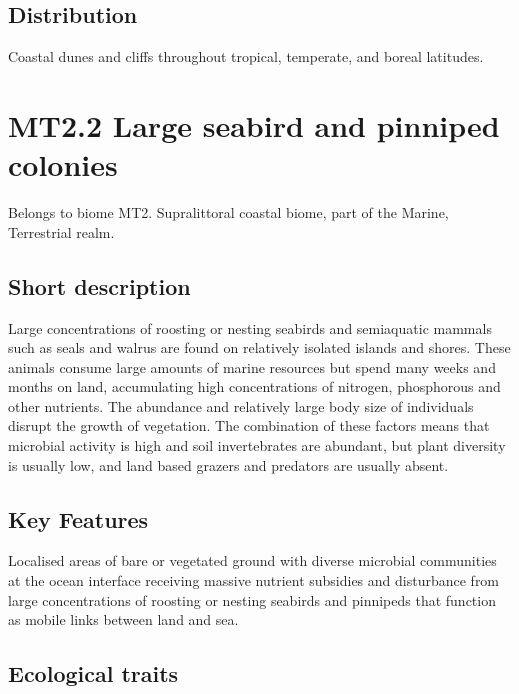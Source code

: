\documentclass[
  letterpaper,
  DIV=11,
  numbers=noendperiod]{scrartcl}
\begin{document}
\subsection{Distribution}\label{distribution-56}

Coastal dunes and cliffs throughout tropical, temperate, and boreal
latitudes.

\section{MT2.2 Large seabird and pinniped
colonies}\label{mt2.2-large-seabird-and-pinniped-colonies}

Belongs to biome MT2. Supralittoral coastal biome, part of the Marine,
Terrestrial realm.

\subsection{Short description}\label{short-description-57}

Large concentrations of roosting or nesting seabirds and semiaquatic
mammals such as seals and walrus are found on relatively isolated
islands and shores. These animals consume large amounts of marine
resources but spend many weeks and months on land, accumulating high
concentrations of nitrogen, phosphorous and other nutrients. The
abundance and relatively large body size of individuals disrupt the
growth of vegetation. The combination of these factors means that
microbial activity is high and soil invertebrates are abundant, but
plant diversity is usually low, and land based grazers and predators are
usually absent.

\subsection{Key Features}\label{key-features-57}

Localised areas of bare or vegetated ground with diverse microbial
communities at the ocean interface receiving massive nutrient subsidies
and disturbance from large concentrations of roosting or nesting
seabirds and pinnipeds that function as mobile links between land and
sea.

\subsection{Ecological traits}\label{ecological-traits-57}
\end{document}
